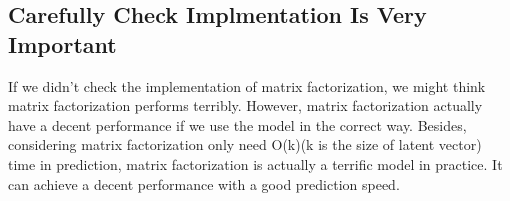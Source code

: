 \documentclass[12pt]{article}
\begin{document}
\subsection{Carefully Check Implmentation Is Very Important}
If we didn't check the implementation of matrix factorization, we might think matrix factorization performs terribly. However, matrix factorization actually have a decent performance if we use the model in the correct way. Besides, considering matrix factorization only need O(k)(k is the size of latent vector) time in prediction, matrix factorization is actually a terrific model in practice. It can achieve a decent performance with a good prediction speed.




	
\end{document}
